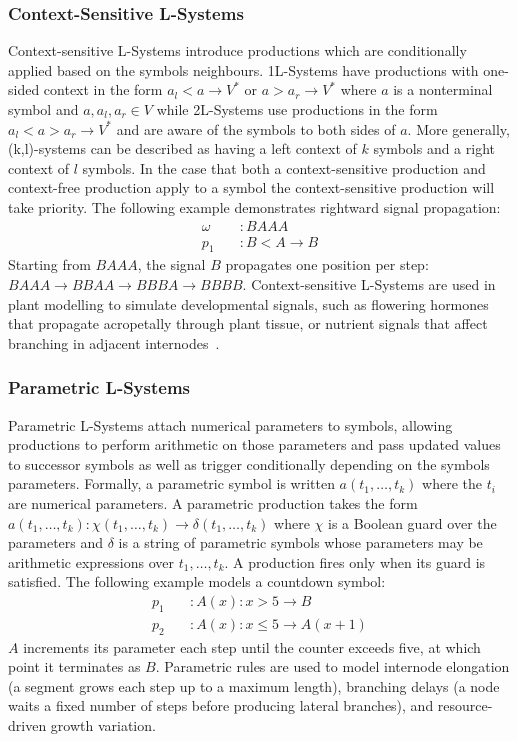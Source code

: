 \subsubsection{Context-Sensitive L-Systems}

Context-sensitive L-Systems introduce productions which are conditionally applied based on the symbols
neighbours. 1L-Systems have productions with one-sided context in the form $a_l < a \rightarrow V^*$ or $a >
a_r \rightarrow V^*$ where $a$ is a nonterminal symbol and $a, a_l, a_r \in V$ while 2L-Systems use
productions in the form $a_l < a > a_r \rightarrow V^*$ and are aware of the symbols to both sides of $a$.
More generally, (k,l)-systems can be described as having a left context of $k$ symbols and a right context of
$l$ symbols. In the case that both a context-sensitive production and context-free production apply to a
symbol the context-sensitive production will take priority. The following example demonstrates rightward
signal propagation:
\begin{align*}
  \omega \quad &: BAAA \\
  p_1    \quad &: B < A \rightarrow B
\end{align*}
Starting from $BAAA$, the signal $B$ propagates one position per step: $BAAA \to BBAA \to BBBA \to BBBB$.
Context-sensitive L-Systems are used in plant modelling to simulate developmental signals, such as flowering
hormones that propagate acropetally through plant tissue, or nutrient signals that affect branching in
adjacent internodes~\cite{prusinkiewiczModelingPlantDevelopment2018}.

\subsubsection{Parametric L-Systems}

Parametric L-Systems attach numerical parameters to symbols, allowing productions to perform arithmetic on
those parameters and pass updated values to successor symbols as well as trigger conditionally depending on
the symbols parameters. Formally, a parametric symbol is written $a(t_1, \dots, t_k)$ where the $t_i$ are
numerical parameters. A parametric production takes the form $a(t_1, \dots, t_k) : \chi(t_1, \dots, t_k) \to
\delta(t_1, \dots, t_k)$ where $\chi$ is a Boolean guard over the parameters and $\delta$ is a string of
parametric symbols whose parameters may be arithmetic expressions over $t_1, \dots, t_k$. A production fires
only when its guard is satisfied. The following example models a countdown symbol:
\begin{align*}
  p_1 \quad &: A(x) : x > 5 \rightarrow B \\
  p_2 \quad &: A(x) : x \leq 5 \rightarrow A(x+1)
\end{align*}
$A$ increments its parameter each step until the counter exceeds five, at which point it terminates as $B$.
Parametric rules are used to model internode elongation (a segment grows each step up to a maximum length),
branching delays (a node waits a fixed number of steps before producing lateral branches), and
resource-driven growth variation.

